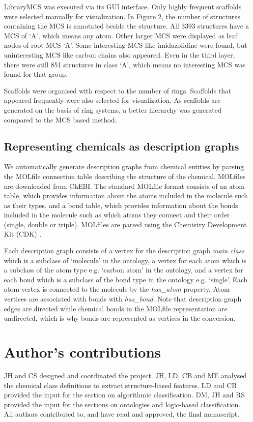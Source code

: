 \documentclass[10pt]{bmc_article}
\newenvironment{bmcformat}{\baselineskip20pt\sloppy\setboolean{publ}{false}}{\baselineskip20pt\sloppy}
\begin{document}
\begin{bmcformat}
LibraryMCS was executed via its GUI interface. Only highly frequent scaffolds were selected manually for visualization. In Figure 2, the number of structures containing the MCS is annotated beside the structure. All 3393 structures have a MCS of `A', which means any atom. Other larger MCS were displayed as leaf nodes of root MCS `A'. Some interesting MCS like imidazolidine were found, but uninteresting MCS like carbon chains also appeared. Even in the third layer, there were still 851 structures in class `A', which means no interesting MCS was found for that group.

Scaffolds were organised with respect to the number of rings. Scaffolds that appeared frequently were also selected for visualization. As scaffolds are generated on the basis of ring systems, a better hierarchy was generated compared to the MCS based method.


\subsection*{Representing chemicals as description graphs}

We automatically generate description graphs from chemical entities by parsing the MOLfile connection table describing the structure of the chemical. MOLfiles are downloaded from ChEBI. The standard MOLfile format consists of an atom table, which provides information about the atoms included in the molecule such as their types, and a bond table, which provides information about the bonds included in the molecule such as which atoms they connect and their order (single, double or triple). MOLfiles are parsed using the Chemistry Development Kit (CDK) \cite{cdk2006}.

Each description graph consists of a vertex for the description graph \textit{main class} which is a subclass of `molecule' in the ontology, a vertex for each atom which is a subclass of the atom type e.g. `carbon atom' in the ontology, and a vertex for each bond which is a subclass of the bond type in the ontology e.g. `single'. Each atom vertex is connected to the molecule by the \textit{has\_atom} property. Atom vertices are associated with bonds with \textit{has\_bond}. Note that description graph edges are directed while chemical bonds in the MOLfile representation are undirected, which is why bonds are represented as vertices in the conversion. 

\bigskip


\section*{Author's contributions}
    JH and CS designed and coordinated the project. JH, LD, CB and ME analysed the chemical class definitions to extract structure-based features. LD and CB provided the input for the section on algorithmic classification. DM, JH and RS provided the input for the sections on ontologies and logic-based classification. All authors contributed to, and have read and approved, the final manuscript. 


\end{bmcformat}
\end{document}
